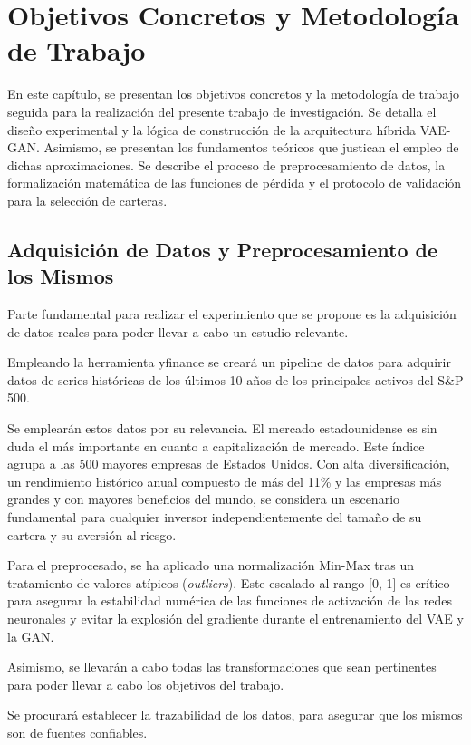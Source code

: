 \chapter{Objetivos Concretos y Metodología de Trabajo}

En este capítulo, se presentan los objetivos concretos y la metodología de trabajo seguida para la realización del presente trabajo de investigación. Se detalla el diseño experimental y la lógica de construcción de la arquitectura híbrida VAE-GAN. Asimismo, se presentan los fundamentos teóricos que justican el empleo de dichas aproximaciones. Se describe el proceso de preprocesamiento de datos, la formalización matemática de las funciones de pérdida y el protocolo de validación para la selección de carteras.

\section{Adquisición de Datos y Preprocesamiento de los Mismos}

Parte fundamental para realizar el experimiento que se propone es la adquisición de datos reales para poder llevar a cabo un estudio relevante.

Empleando la herramienta yfinance se creará un pipeline de datos para adquirir datos de series históricas de los últimos 10 años de los principales activos del S\&P 500.

Se emplearán estos datos por su relevancia. El mercado estadounidense es sin duda el más importante en cuanto a capitalización de mercado. Este índice agrupa a las 500 mayores empresas de Estados Unidos. Con alta diversificación, un rendimiento histórico anual compuesto de más del 11\% y las empresas más grandes y con mayores beneficios del mundo, se considera un escenario fundamental para cualquier inversor independientemente del tamaño de su cartera y su aversión al riesgo.

Para el preprocesado, se ha aplicado una normalización Min-Max tras un tratamiento de valores atípicos (\textit{outliers}). Este escalado al rango [0, 1] es crítico para asegurar la estabilidad numérica de las funciones de activación de las redes neuronales y evitar la explosión del gradiente durante el entrenamiento del VAE y la GAN.

Asimismo, se llevarán a cabo todas las transformaciones que sean pertinentes para poder llevar a cabo los objetivos del trabajo.

Se procurará establecer la trazabilidad de los datos, para asegurar que los mismos son de fuentes confiables.

